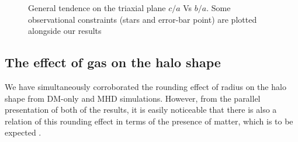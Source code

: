 \begin{figure}[!ht]
  \centering
  \hfill
  \hfill
  \caption{General tendence on the triaxial plane $c/a$ Vs $b/a$. Some observational constraints (stars and error-bar point) are plotted alongside our results}
  \label{fig:Triaxiality_Inner_Outer}
\end{figure}


\subsection{The effect of gas on the halo shape}
We have simultaneously corroborated the rounding effect of radius on the halo shape from DM-only and MHD simulations. However, from the parallel presentation of both of the results, it is easily noticeable that there is also a relation of this rounding effect in terms of the presence of matter, which is to be expected \cite{effect of gas}.\\

